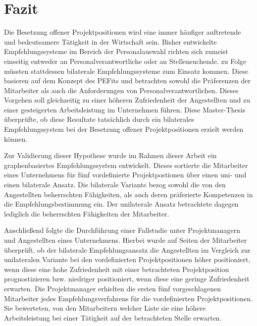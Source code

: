 \chapter{Fazit}
\label{ch:fazit}
Die Besetzung offener Projektpositionen wird eine immer häufiger auftretende und bedeutsamere Tätigkeit in der Wirtschaft sein. Bisher entwickelte Empfehlungssysteme im Bereich der Personalauswahl richten sich zumeist einseitig entweder an Personalverantwortliche oder an Stellensuchende. \textcite[S. 1ff.]{malinowski:2006} zu Folge müssten stattdessen bilaterale Empfehlungssysteme zum Einsatz kommen. Diese basieren auf dem Konzept des \aclp{PEFit} und betrachten sowohl die Präferenzen der Mitarbeiter als auch die Anforderungen von Personalverantwortlichen. Dieses Vorgehen soll gleichzeitig zu einer höheren Zufriedenheit der Angestellten und zu einer gesteigerten Arbeitsleistung im Unternehmen führen. Diese Master-Thesis überprüfte, ob diese Resultate tatsächlich durch ein bilaterales Empfehlungssystem bei der Besetzung offener Projektpositionen erzielt werden können.

Zur Validierung dieser Hypothese wurde im Rahmen dieser Arbeit ein graphenbasiertes Empfehlungssystem entwickelt. Dieses sortierte die Mitarbeiter eines Unternehmens für fünf vordefinierte Projektpostionen über einen uni- und einen bilaterale Ansatz. Die bilaterale Variante bezog sowohl die von den Angestellten beherrschten Fähigkeiten, als auch deren präferierte Kompetenzen in die Empfehlungsbestimmung ein. Der unilaterale Ansatz betrachtete dagegen lediglich die beherrschten Fähigkeiten der Mitarbeiter.

Anschließend folgte die Durchführung einer Fallstudie unter Projektmanagern und Angestellten eines Unternehmens. Hierbei wurde auf Seiten der Mitarbeiter überprüft, ob der bilaterale Empfehlungsansatz die Angestellten im Vergleich zur unilateralen Variante bei den vordefinierten Projektpositionen höher positioniert, wenn diese eine hohe Zufriedenheit mit einer betrachteten Projektposition prognostizieren bzw. niedriger positioniert, wenn diese eine geringe Zufriedenheit erwarten. Die Projektmanager erhielten die ersten fünf vorgeschlagenen Mitarbeiter jedes Empfehlungsverfahrens für die vordefinierten Projektpositionen. Sie bewerteten, von den Mitarbeitern welcher Liste sie eine höhere Arbeitsleistung bei einer Tätigkeit auf der betrachteten Stelle erwarten.

